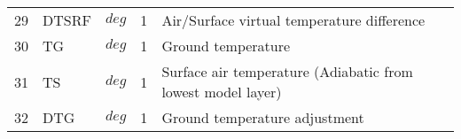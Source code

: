 \begin{tabular}{lllll}
29 & DTSRF     &  $deg$ &  1
         &\begin{minipage}[t]{3in}
          {Air/Surface virtual temperature difference}
         \end{minipage}\\
30 & TG        &  $deg$ &  1
         &\begin{minipage}[t]{3in}
          {Ground temperature}
         \end{minipage}\\
31 & TS        &  $deg$ &  1
         &\begin{minipage}[t]{3in}
          {Surface air temperature (Adiabatic from lowest model layer)}
         \end{minipage}\\
32 & DTG       &  $deg$ &  1
         &\begin{minipage}[t]{3in}
          {Ground temperature adjustment}
         \end{minipage}\\

\end{tabular}

